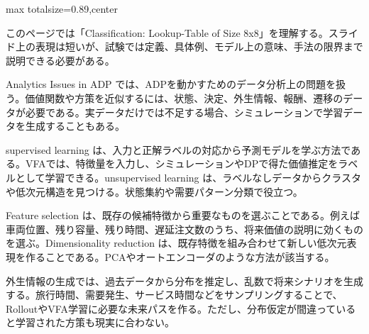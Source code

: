 \begin{minipage}[t]{0.58\textwidth}
\begin{adjustbox}{max totalsize={\textwidth}{0.89\textheight},center}
\begin{minipage}{\textwidth}\scriptsize
{}このページでは「Classification: Lookup-Table of Size 8x8」を理解する。スライド上の表現は短いが、試験では定義、具体例、モデル上の意味、手法の限界まで説明できる必要がある。\par
Analytics Issues in ADP では、ADPを動かすためのデータ分析上の問題を扱う。価値関数や方策を近似するには、状態、決定、外生情報、報酬、遷移のデータが必要である。実データだけでは不足する場合、シミュレーションで学習データを生成することもある。\par
supervised learning は、入力と正解ラベルの対応から予測モデルを学ぶ方法である。VFAでは、特徴量を入力し、シミュレーションやDPで得た価値推定をラベルとして学習できる。unsupervised learning は、ラベルなしデータからクラスタや低次元構造を見つける。状態集約や需要パターン分類で役立つ。\par
Feature selection は、既存の候補特徴から重要なものを選ぶことである。例えば車両位置、残り容量、残り時間、遅延注文数のうち、将来価値の説明に効くものを選ぶ。Dimensionality reduction は、既存特徴を組み合わせて新しい低次元表現を作ることである。PCAやオートエンコーダのような方法が該当する。\par
外生情報の生成では、過去データから分布を推定し、乱数で将来シナリオを生成する。旅行時間、需要発生、サービス時間などをサンプリングすることで、RolloutやVFA学習に必要な未来パスを作る。ただし、分布仮定が間違っていると学習された方策も現実に合わない。\par

\end{minipage}
\end{adjustbox}
\end{minipage}
